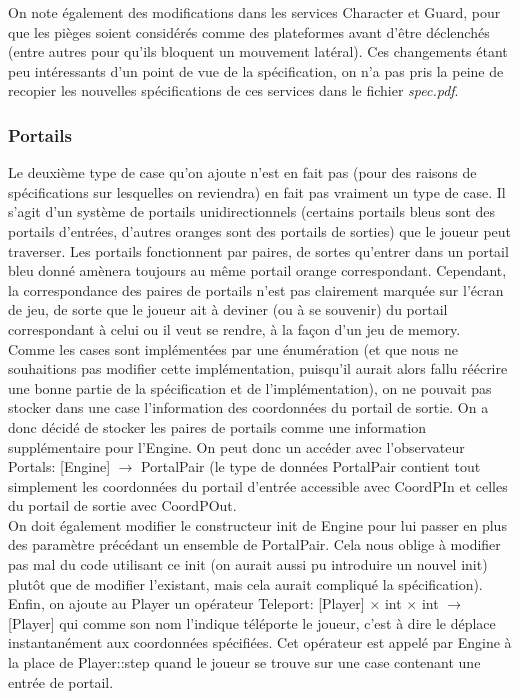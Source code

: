\documentclass{article}
\begin{document}
On note également des modifications dans les services \textrm{Character} et \textrm{Guard}, pour que les pièges soient considérés comme des plateformes avant d'être déclenchés (entre autres pour qu'ils bloquent un mouvement latéral). Ces changements étant peu intéressants d'un point de vue de la spécification, on n'a pas pris la peine de recopier les nouvelles spécifications de ces services dans le fichier \textit{spec.pdf}.

\subsubsection{Portails}
Le deuxième type de case qu'on ajoute n'est en fait pas (pour des raisons de spécifications sur lesquelles on reviendra) en fait pas vraiment un type de case. Il s'agit d'un système de portails unidirectionnels (certains portails bleus sont des portails d'entrées, d'autres oranges sont des portails de sorties) que le joueur peut traverser. Les portails fonctionnent par paires, de sortes qu'entrer dans un portail bleu donné amènera toujours au même portail orange correspondant. Cependant, la correspondance des paires de portails n'est pas clairement marquée sur l'écran de jeu, de sorte que le joueur ait à deviner (ou à se souvenir) du portail correspondant à celui ou il veut se rendre, à la façon d'un jeu de memory.\\

Comme les cases sont implémentées par une énumération (et que nous ne souhaitions pas modifier cette implémentation, puisqu'il aurait alors fallu réécrire une bonne partie de la spécification et de l'implémentation), on ne pouvait pas stocker dans une case l'information des coordonnées du portail de sortie. On a donc décidé de stocker les paires de portails comme une information supplémentaire pour l'\textrm{Engine}. On peut donc un accéder avec l'observateur \textrm{Portals: [Engine] $\rightarrow$ PortalPair} (le type de données \textrm{PortalPair} contient tout simplement les coordonnées du portail d'entrée accessible avec \textrm{CoordPIn} et celles du portail de sortie avec \textrm{CoordPOut}.\\
On doit également modifier le constructeur \textrm{init} de \textrm{Engine} pour lui passer en plus des paramètre précédant un ensemble de \textrm{PortalPair}. Cela nous oblige à modifier pas mal du code utilisant ce \textrm{init} (on aurait aussi pu introduire un nouvel \textrm{init}) plutôt que de modifier l'existant, mais cela aurait compliqué la spécification).\\
Enfin, on ajoute au \textrm{Player} un opérateur \textrm{Teleport: [Player] $\times$ int $\times$ int $\rightarrow$ [Player]} qui comme son nom l'indique téléporte le joueur, c'est à dire le déplace instantanément aux coordonnées spécifiées. Cet opérateur est appelé par \textrm{Engine} à la place de \textrm{Player::step} quand le joueur se trouve sur une case contenant une entrée de portail.
\end{document}
